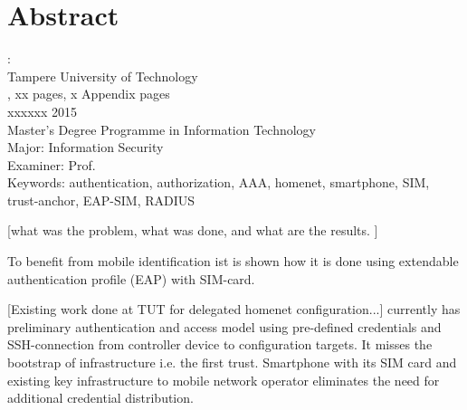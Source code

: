 \documentclass[12pt,a4paper,english]{tutthesis}
\begin{document}
\if@twoside
\clearpage
\fi


\setcounter{page}{0} %

\chapter*{Abstract}

\begin{spacing}{1.0}
  {\bf \textsf{\MakeUppercase{\@author}}}: \@title\\   %
   \textsf{Tampere University of Technology}\\
   \textsf{\@thesistype, xx pages, x Appendix pages} \\
   \textsf{xxxxxx 2015}\\
   \textsf{Master's Degree Programme in Information Technology}\\
   \textsf{Major: Information Security}\\
   \textsf{Examiner: Prof. \@examiner}\\ %
   \textsf{Keywords: authentication, authorization, AAA, homenet, smartphone, SIM, trust-anchor, EAP-SIM, RADIUS}\\
\end{spacing}

[what was the problem, what was done, and what are the results. ]

To benefit from mobile identification ist is shown how
it is done using extendable authentication profile (EAP) with SIM-card. 


[Existing work done at TUT for delegated homenet configuration...]
currently has preliminary authentication and access model using
pre-defined credentials and SSH-connection from 
controller device to configuration targets. It misses the bootstrap of 
infrastructure i.e. the first trust. 
Smartphone with its SIM card and existing key infrastructure to mobile network operator eliminates the need for additional credential distribution.
\end{document}
